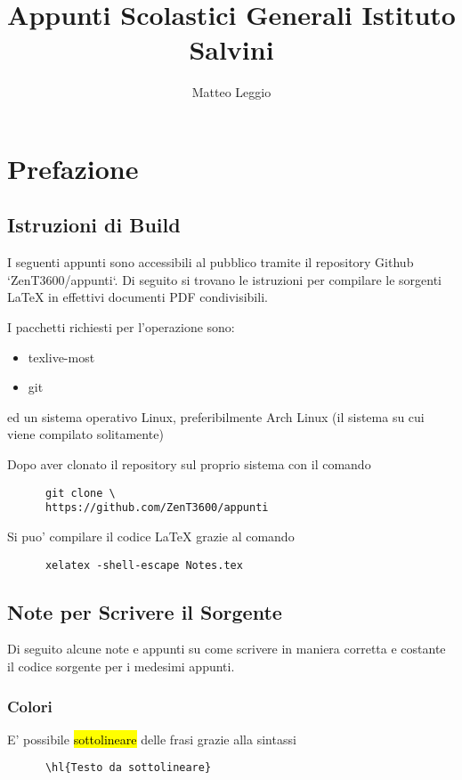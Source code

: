 \documentclass{article}
\begin{document}
  \title{\Huge Appunti Scolastici  Generali Istituto Salvini}
  \author{\Large Matteo Leggio}
  \date{}
  \maketitle

  \section{Prefazione}
  {
    \subsection{Istruzioni di Build}
    I seguenti appunti sono accessibili al pubblico tramite il repository Github `ZenT3600/appunti`. Di seguito si trovano le istruzioni per compilare le sorgenti LaTeX in effettivi documenti PDF condivisibili.

    I pacchetti richiesti per l'operazione sono:
    \begin{itemize}
      \item texlive-most
      \item git
    \end{itemize}
    ed un sistema operativo Linux, preferibilmente Arch Linux (il sistema su cui viene compilato solitamente)

    Dopo aver clonato il repository sul proprio sistema con il comando
    \begin{verbatim}
      git clone \
      https://github.com/ZenT3600/appunti
    \end{verbatim}

    Si puo' compilare il codice LaTeX grazie al comando
    \begin{verbatim}
      xelatex -shell-escape Notes.tex
    \end{verbatim}

    \subsection{Note per Scrivere il Sorgente}
    Di seguito alcune note e appunti su come scrivere in maniera corretta e costante il codice sorgente per i medesimi appunti.

    \subsubsection{Colori}
    E' possibile \hl{sottolineare} delle frasi grazie alla sintassi
    \begin{verbatim}
      \hl{Testo da sottolineare}
    \end{verbatim}

}
\end{document}
